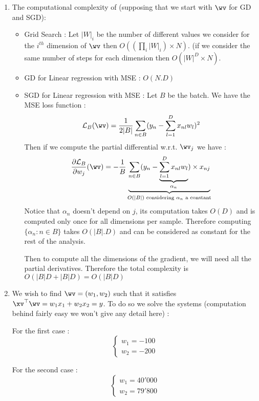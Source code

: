 \documentclass{./../../tex_import/ETHuebung_english}
\begin{document}
\begin{enumerate}
\begin{enumerate}
		\item The computational complexity of (supposing that we start with $\wv$ for GD and SGD): 
			\begin{itemize}
				\item Grid Search : Let $|W|_i$ be the number of different values we consider for the $i^{th}$ dimension of $\wv$ then $O((\prod_i|W|_i )\times N)$. (if we consider the same number of steps for each dimension then $O(|W|^D\times N)$.
				\item GD for Linear regression with MSE : $O(N.D)$
				\item SGD for Linear regression with MSE : Let $B$ be the batch. We have the MSE loss function :
					\begin{equation}
						\mathcal{L}_B(\wv) = \frac{1}{2|B|} \sum_{n \in B} (y_n - \sum_{l=1}^D x_{nl}w_{l})^2
					\end{equation}
					Then if we compute the partial differential w.r.t. $\wv_{j}$ we have :
					\begin{equation}
						\frac{\partial\mathcal{L}_B}{\partial w_{j}}(\wv) = -\frac{1}{B} \underbrace{\sum_{n\in B} (y_n - \underbrace{\sum_{l=1}^D x_{nl}w_{l}}_{\alpha_n}) \times x_{nj}}_{O(|B|)\text{ considering  }\alpha_n \text{ a constant}}
					\end{equation}
					Notice that $\alpha_n$ doesn't depend on $j$, its computation takes $O(D)$ and is computed only once for all dimensions per sample. Therefore computing $\{\alpha_n : n \in B\}$ takes $O(|B|.D)$ and can be considered as constant for the rest of the analysis.
					
					Then to compute all the dimensions of the gradient, we will need all the partial derivatives. Therefore the total complexity is $O(|B|D+|B|D) = O (|B|D)$
			\end{itemize}
		
		\item We wish to find $\wv = (w_1,w_2)$ such that it satisfies $\xv^\top\wv = w_1 x_1 + w_2 x_2 = y$. To do so we solve the systems (computation behind fairly easy we won't give any detail here) :
			
			For the first case :
			\begin{equation*}
				\begin{cases}
					w_1 = -100\\
					w_2 = -200
				\end{cases}
			\end{equation*}
			
			For the second case :
			\begin{equation*}
				\begin{cases}
					w_1 = 40'000\\
					w_2 = 79'800
				\end{cases}
			\end{equation*}
		

\end{enumerate}
\end{enumerate}
\end{document}
